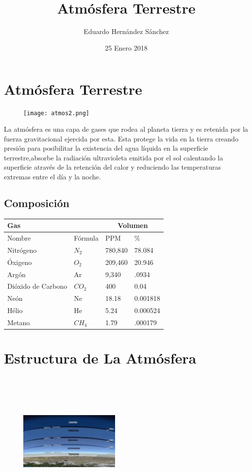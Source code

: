 \documentclass{article}
\title{Atmósfera Terrestre}
\author{Eduardo Hernández Sánchez}
\date{25 Enero 2018}
\begin{document}
\maketitle
\section{Atmósfera Terrestre}
\begin{figure}[h!]
\centering
\texttt{[image: atmos2.png]}
\end{figure}
La atmósfera es una capa de gases que rodea al planeta tierra y es retenida por la fuerza gravitacional ejercida por esta.
Esta protege la vida en la tierra creando presión para posibilitar la existencia del agua líquida en la superficie terrestre,absorbe la radiación ultravioleta emitida por el sol calentando la superficie através de la retención del calor y reduciendo las temperaturas extremas entre el día y la noche.


\subsection{Composición}

\begin{center}
    \begin{tabular}{| l | l | l | l |} \hline
   \multicolumn{2}{|l|}{\textbf{Gas}} &\multicolumn{2}{|c|}{\textbf{Volumen}}  \\ \hline
    Nombre & Fórmula & PPM & \% \\ \hline
    Nitrógeno & $N_2$ & 780,840 & 78.084 \\ \hline
    Óxigeno & $O_2$ & 209,460 & 20.946 \\ \hline
    Argón & Ar & 9,340 & .0934 \\ \hline
    Dióxido de Carbono & $CO_2$ & 400 & 0.04 \\ \hline
    Neón & Ne & 18.18 & 0.001818 \\ \hline
    Hélio & He & 5.24 & 0.000524 \\ \hline
    Metano & $CH_4$ & 1.79 & .000179 \\ \hline
  \hline
    \end{tabular}
\end{center}
\section{Estructura de La Atmósfera}
\begin{figure}[h!]
\centering
\includegraphics[width=5.0cm,height=7.0cm]{atmos.jpg}
\end{figure}
\end{document}
